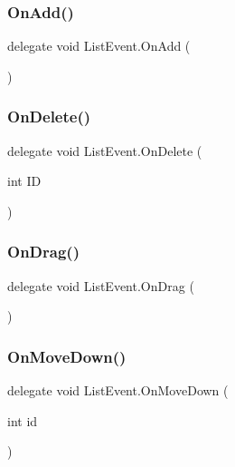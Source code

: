 \mbox{\label{class_list_event_a8e0b5ea423eb293686ae220894ccdad9}} 
\subsubsection{On\+Add()}
{\footnotesize\ttfamily delegate void List\+Event.\+On\+Add (\begin{DoxyParamCaption}{ }\end{DoxyParamCaption})}

\mbox{\label{class_list_event_acd781989690dd6107295475d420ae616}} 
\subsubsection{On\+Delete()}
{\footnotesize\ttfamily delegate void List\+Event.\+On\+Delete (\begin{DoxyParamCaption}\item[{int}]{ID }\end{DoxyParamCaption})}

\mbox{\label{class_list_event_a94ccd558e5b248e11208c9aaccc9031d}} 
\subsubsection{On\+Drag()}
{\footnotesize\ttfamily delegate void List\+Event.\+On\+Drag (\begin{DoxyParamCaption}{ }\end{DoxyParamCaption})}

\mbox{\label{class_list_event_a4a786db2520ba20baca4951cb085898d}} 
\subsubsection{On\+Move\+Down()}
{\footnotesize\ttfamily delegate void List\+Event.\+On\+Move\+Down (\begin{DoxyParamCaption}\item[{int}]{id }\end{DoxyParamCaption})}

\mbox{\label{class_list_event_a217241b9eff76aa60456b57c3d5a8d1e}} 
